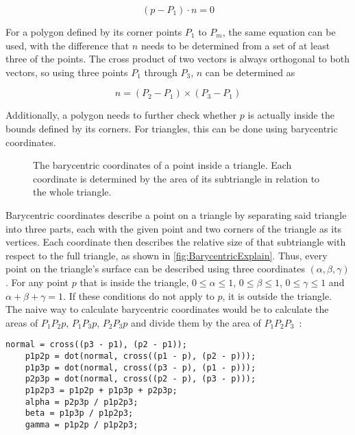 \begin{equation}\label{StaticSurface}
    (p - P_1) \cdot n = 0
\end{equation}

For a polygon defined by its corner points \(P_{1}\) to \(P_{m}\), the same equation can be used,
with the difference that \(n\) needs to be determined from a set of at least three of the points.
The cross product of two vectors is always orthogonal to both vectors, so using three points \(P_{1}\) through \(P_{3}\),
\(n\) can be determined as

\begin{equation}\label{PolygonNormal}
    n = (P_{2} - P_{1}) \times (P_{3} - P_{1})
\end{equation}

Additionally, a polygon needs to further check whether \(p\) is actually inside the bounds defined by its corners.
For triangles, this can be done using barycentric coordinates.
\newline
\begin{figure}[t!]
    \begin{center}
    
    \end{center}
    \caption[Visualization of barycentric coordinates]{The barycentric coordinates of a point inside a triangle. Each coordinate is determined by the area of its subtriangle in relation to the whole triangle.}\label{fig:BarycentricExplain}
\end{figure}
Barycentric coordinates describe a point on a triangle by separating said triangle into three parts,
each with the given point and two corners of the triangle as its vertices.
Each coordinate then describes the relative size of that subtriangle with respect to the full triangle,
as shown in \autoref{fig:BarycentricExplain}.
\newline
Thus, every point on the triangle's surface can be described using three coordinates \((\alpha, \beta, \gamma)\).
For any point \(p\) that is inside the triangle,
\(0 \le \alpha \le 1\), \(0 \le \beta \le 1\), \(0 \le \gamma \le 1\) and \(\alpha + \beta + \gamma = 1\).
If these conditions do not apply to \(p\), it is outside the triangle.
\newline
The naive way to calculate barycentric coordinates would be to calculate the areas of \(P_1P_2p\), \(P_1P_3p\), \(P_2P_3p\) and
divide them by the area of \(P_1P_2P_3\)~\cite{SM09}:
\begin{minipage}{\linewidth}
\begin{lstlisting}[basicstyle=\small, caption={[Barycentric coordinate calculation]Barycentric coordinate calculation}, label={lst:barycentric}]
    normal = cross((p3 - p1), (p2 - p1));
    p1p2p = dot(normal, cross((p1 - p), (p2 - p)));
    p1p3p = dot(normal, cross((p3 - p), (p1 - p)));
    p2p3p = dot(normal, cross((p2 - p), (p3 - p)));
    p1p2p3 = p1p2p + p1p3p + p2p3p;
    alpha = p2p3p / p1p2p3;
    beta = p1p3p / p1p2p3;
    gamma = p1p2p / p1p2p3;
\end{lstlisting}
\end{minipage}
